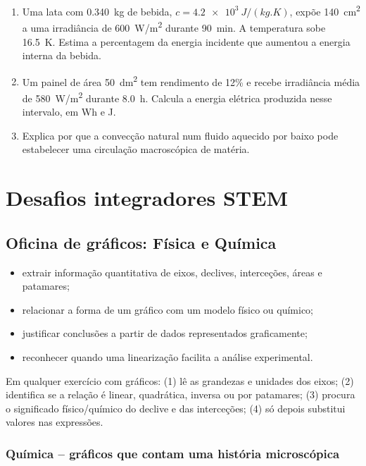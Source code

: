 \documentclass[11pt,a4paper,oneside]{book}
\begin{document}
\begin{exercicios}
\begin{enumerate}
  \item Uma lata com \SI{0.340}{kg} de bebida, $c=\SI{4.2e3}{J/(kg.K)}$, expõe \SI{140}{cm^2} a uma irradiância de \SI{600}{W/m^2} durante \SI{90}{min}. A temperatura sobe \SI{16.5}{K}. Estima a percentagem da energia incidente que aumentou a energia interna da bebida.
  \item Um painel de área \SI{50}{dm^2} tem rendimento de 12\% e recebe irradiância média de \SI{580}{W/m^2} durante \SI{8.0}{h}. Calcula a energia elétrica produzida nesse intervalo, em Wh e J.
  \item Explica por que a convecção natural num fluido aquecido por baixo pode estabelecer uma circulação macroscópica de matéria.
\end{enumerate}
\end{exercicios}

\part{Desafios integradores STEM}

\chapter{Oficina de gráficos: Física e Química}
\begin{objetivos}
\begin{itemize}
  \item extrair informação quantitativa de eixos, declives, interceções, áreas e patamares;
  \item relacionar a forma de um gráfico com um modelo físico ou químico;
  \item justificar conclusões a partir de dados representados graficamente;
  \item reconhecer quando uma linearização facilita a análise experimental.
\end{itemize}
\end{objetivos}

\begin{metodo}[title=Antes de fazer contas]
Em qualquer exercício com gráficos: (1) lê as grandezas e unidades dos eixos; (2) identifica se a relação é linear, quadrática, inversa ou por patamares; (3) procura o significado físico/químico do declive e das interceções; (4) só depois substitui valores nas expressões.
\end{metodo}

\section{Química -- gráficos que contam uma história microscópica}
\end{document}
